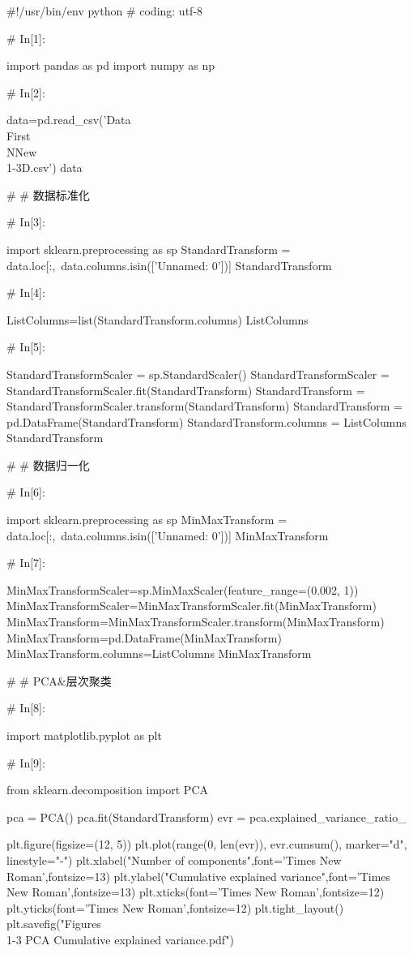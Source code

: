 \documentclass{MathorCupModeling}
\begin{document}
\begin{python}
#!/usr/bin/env python
# coding: utf-8

# In[1]:


import pandas as pd
import numpy as np


# In[2]:


data=pd.read_csv('Data\\First\\NNew\\1-3D.csv')
data


# # 数据标准化

# In[3]:


import sklearn.preprocessing as sp
StandardTransform = data.loc[:,~data.columns.isin(['Unnamed: 0'])]
StandardTransform


# In[4]:


ListColumns=list(StandardTransform.columns)
ListColumns


# In[5]:


StandardTransformScaler = sp.StandardScaler()
StandardTransformScaler = StandardTransformScaler.fit(StandardTransform)
StandardTransform = StandardTransformScaler.transform(StandardTransform)
StandardTransform = pd.DataFrame(StandardTransform)
StandardTransform.columns = ListColumns
StandardTransform


# # 数据归一化

# In[6]:


import sklearn.preprocessing as sp
MinMaxTransform = data.loc[:,~data.columns.isin(['Unnamed: 0'])]
MinMaxTransform


# In[7]:


MinMaxTransformScaler=sp.MinMaxScaler(feature_range=(0.002, 1))
MinMaxTransformScaler=MinMaxTransformScaler.fit(MinMaxTransform)
MinMaxTransform=MinMaxTransformScaler.transform(MinMaxTransform)
MinMaxTransform=pd.DataFrame(MinMaxTransform)
MinMaxTransform.columns=ListColumns
MinMaxTransform


# # PCA&层次聚类

# In[8]:


import matplotlib.pyplot as plt


# In[9]:


from sklearn.decomposition import PCA

pca = PCA()
pca.fit(StandardTransform)
evr = pca.explained_variance_ratio_

plt.figure(figsize=(12, 5))
plt.plot(range(0, len(evr)), evr.cumsum(), marker="d", linestyle="-")
plt.xlabel("Number of components",font='Times New Roman',fontsize=13)
plt.ylabel("Cumulative explained variance",font='Times New Roman',fontsize=13)
plt.xticks(font='Times New Roman',fontsize=12)
plt.yticks(font='Times New Roman',fontsize=12)
plt.tight_layout()
plt.savefig("Figures\\1-3 PCA Cumulative explained variance.pdf")



\end{python}
\end{document}
